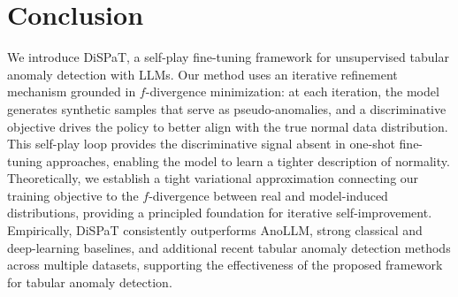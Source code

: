\section{Conclusion}
We introduce DiSPaT, a self-play fine-tuning framework for unsupervised tabular anomaly detection with LLMs. Our method uses an iterative refinement mechanism grounded in $f$-divergence minimization: at each iteration, the model generates synthetic samples that serve as pseudo-anomalies, and a discriminative objective drives the policy to better align with the true normal data distribution. This self-play loop provides the discriminative signal absent in one-shot fine-tuning approaches, enabling the model to learn a tighter description of normality. Theoretically, we establish a tight variational approximation connecting our training objective to the $f$-divergence between real and model-induced distributions, providing a principled foundation for iterative self-improvement. Empirically, DiSPaT consistently outperforms AnoLLM, strong classical and deep-learning baselines, and additional recent tabular anomaly detection methods across multiple datasets, supporting the effectiveness of the proposed framework for tabular anomaly detection.